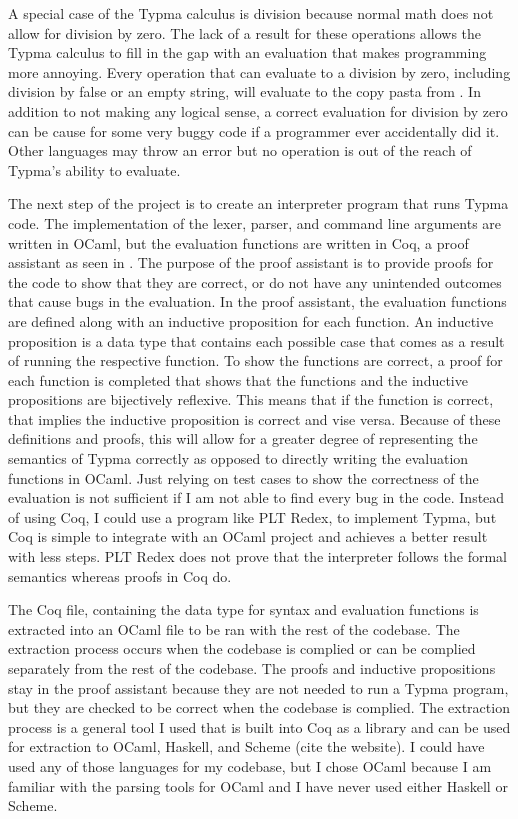 \documentclass[10pt,twocolumn]{article}
\begin{document}
A special case of the Typma calculus is division because normal math does not allow for division by zero. The lack of a result for these operations allows the Typma calculus to fill in the gap with an evaluation that makes programming more annoying. Every operation that can evaluate to a division by zero, including division by false or an empty string, will evaluate to the copy pasta from \textcite{pacer}. In addition to not making any logical sense, a correct evaluation for division by zero can be cause for some very buggy code if a programmer ever accidentally did it. Other languages may throw an error but no operation is out of the reach of Typma's ability to evaluate.

The next step of the project is to create an interpreter program that runs Typma code. The implementation of the lexer, parser, and command line arguments are written in OCaml, but the evaluation functions are written in Coq, a proof assistant as seen in \textcite{Pierce2021Software}. The purpose of the proof assistant is to provide proofs for the code to show that they are correct, or do not have any unintended outcomes that cause bugs in the evaluation. In the proof assistant, the evaluation functions are defined along with an inductive proposition for each function. An inductive proposition is a data type that contains each possible case that comes as a result of running the respective function. To show the functions are correct, a proof for each function is completed that shows that the functions and the inductive propositions are bijectively reflexive. This means that if the function is correct, that implies the inductive proposition is correct and vise versa. Because of these definitions and proofs, this will allow for a greater degree of representing the semantics of Typma correctly as opposed to directly writing the evaluation functions in OCaml. Just relying on test cases to show the correctness of the evaluation is not sufficient if I am not able to find every bug in the code. Instead of using Coq, I could use a program like PLT Redex, to implement Typma, but Coq is simple to integrate with an OCaml project and achieves a better result with less steps. PLT Redex does not prove that the interpreter follows the formal semantics whereas proofs in Coq do.

The Coq file, containing the data type for syntax and evaluation functions is extracted into an OCaml file to be ran with the rest of the codebase. The extraction process occurs when the codebase is complied or can be complied separately from the rest of the codebase. The proofs and inductive propositions stay in the proof assistant because they are not needed to run a Typma program, but they are checked to be correct when the codebase is complied. The extraction process is a general tool I used that is built into Coq as a library and can be used for extraction to OCaml, Haskell, and Scheme (cite the website). I could have used any of those languages for my codebase, but I chose OCaml because I am familiar with the parsing tools for OCaml and I have never used either Haskell or Scheme.
\end{document}
